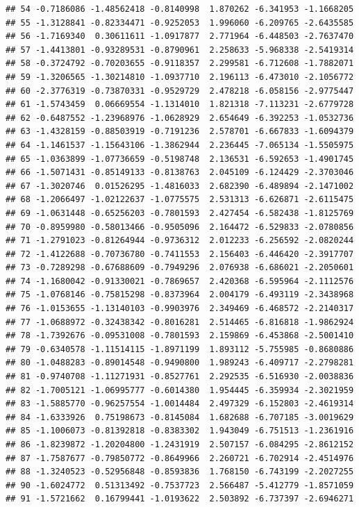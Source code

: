\documentclass[]{article}
\begin{document}
\begin{verbatim}
## 54 -0.7186086 -1.48562418 -0.8140998  1.870262 -6.341953 -1.1668205
## 55 -1.3128841 -0.82334471 -0.9252053  1.996060 -6.209765 -2.6435585
## 56 -1.7169340  0.30611611 -1.0917877  2.771964 -6.448503 -2.7637470
## 57 -1.4413801 -0.93289531 -0.8790961  2.258633 -5.968338 -2.5419314
## 58 -0.3724792 -0.70203655 -0.9118357  2.299581 -6.712608 -1.7882071
## 59 -1.3206565 -1.30214810 -1.0937710  2.196113 -6.473010 -2.1056772
## 60 -2.3776319 -0.73870331 -0.9529729  2.478218 -6.058156 -2.9775447
## 61 -1.5743459  0.06669554 -1.1314010  1.821318 -7.113231 -2.6779728
## 62 -0.6487552 -1.23968976 -1.0628929  2.654649 -6.392253 -1.0532736
## 63 -1.4328159 -0.88503919 -0.7191236  2.578701 -6.667833 -1.6094379
## 64 -1.1461537 -1.15643106 -1.3862944  2.236445 -7.065134 -1.5505975
## 65 -1.0363899 -1.07736659 -0.5198748  2.136531 -6.592653 -1.4901745
## 66 -1.5071431 -0.85149133 -0.8138763  2.045109 -6.124429 -2.3703046
## 67 -1.3020746  0.01526295 -1.4816033  2.682390 -6.489894 -2.1471002
## 68 -1.2066497 -1.02122637 -1.0775575  2.531313 -6.626871 -2.6115475
## 69 -1.0631448 -0.65256203 -0.7801593  2.427454 -6.582438 -1.8125769
## 70 -0.8959980 -0.58013466 -0.9505096  2.164472 -6.529833 -2.0780856
## 71 -1.2791023 -0.81264944 -0.9736312  2.012233 -6.256592 -2.0820244
## 72 -1.4122688 -0.70736780 -0.7411553  2.156403 -6.446420 -2.3917707
## 73 -0.7289298 -0.67688609 -0.7949296  2.076938 -6.686021 -2.2050601
## 74 -1.1680042 -0.91330021 -0.7869657  2.420368 -6.595964 -2.1112576
## 75 -1.0768146 -0.75815298 -0.8373964  2.004179 -6.493119 -2.3438968
## 76 -1.0153655 -1.13140103 -0.9903976  2.349469 -6.468572 -2.2140317
## 77 -1.0688972 -0.32438342 -0.8016281  2.514465 -6.816818 -1.9862924
## 78 -1.7392676 -0.09531008 -0.7801593  2.159869 -6.453868 -2.5001410
## 79 -0.6340578 -1.11514115 -1.8971199  1.893112 -5.755985 -0.8680886
## 80 -1.0488283 -0.89014548 -0.9490800  1.989243 -6.409717 -2.2798281
## 81 -0.9740708 -1.11271931 -0.8527761  2.292535 -6.516930 -2.0038836
## 82 -1.7005121 -1.06995777 -0.6014380  1.954445 -6.359934 -2.3021959
## 83 -1.5885770 -0.96257554 -1.0014484  2.497329 -6.152803 -2.4619314
## 84 -1.6333926  0.75198673 -0.8145084  1.682688 -6.707185 -3.0019629
## 85 -1.1006073 -0.81392818 -0.8383302  1.943049 -6.751513 -1.2361916
## 86 -1.8239872 -1.20204800 -1.2431919  2.507157 -6.084295 -2.8612152
## 87 -1.7587677 -0.79850772 -0.8649966  2.260721 -6.702914 -2.4514976
## 88 -1.3240523 -0.52956848 -0.8593836  1.768150 -6.743199 -2.2027255
## 90 -1.6024772  0.51313492 -0.7537723  2.566487 -5.412779 -1.8571059
## 91 -1.5721662  0.16799441 -1.0193622  2.503892 -6.737397 -2.6946271

\end{verbatim}
\end{document}
